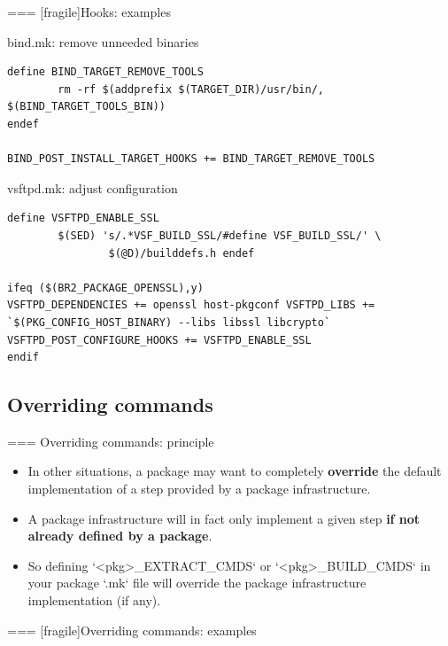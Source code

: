 === [fragile]{Hooks: examples}

\begin{block}{bind.mk: remove unneeded binaries}
  \begin{verbatim}
define BIND_TARGET_REMOVE_TOOLS
        rm -rf $(addprefix $(TARGET_DIR)/usr/bin/, $(BIND_TARGET_TOOLS_BIN))
endef

BIND_POST_INSTALL_TARGET_HOOKS += BIND_TARGET_REMOVE_TOOLS
  \end{verbatim}
\end{block}

\begin{block}{vsftpd.mk: adjust configuration}
  \begin{verbatim}
define VSFTPD_ENABLE_SSL
        $(SED) 's/.*VSF_BUILD_SSL/#define VSF_BUILD_SSL/' \
                $(@D)/builddefs.h endef

ifeq ($(BR2_PACKAGE_OPENSSL),y)
VSFTPD_DEPENDENCIES += openssl host-pkgconf VSFTPD_LIBS += `$(PKG_CONFIG_HOST_BINARY) --libs libssl libcrypto`
VSFTPD_POST_CONFIGURE_HOOKS += VSFTPD_ENABLE_SSL
endif
  \end{verbatim}
\end{block}



\subsection{Overriding commands}

=== {Overriding commands: principle}

  \begin{itemize}
  \item In other situations, a package may want to completely {\bf
      override} the default implementation of a step provided by a
    package infrastructure.

  \item A package infrastructure will in fact only implement a given
    step {\bf if not already defined by a package}.

  \item So defining `<pkg>_EXTRACT_CMDS` or
    `<pkg>_BUILD_CMDS` in your package `.mk` file will
    override the package infrastructure implementation (if any).

  \end{itemize}



=== [fragile]{Overriding commands: examples}

